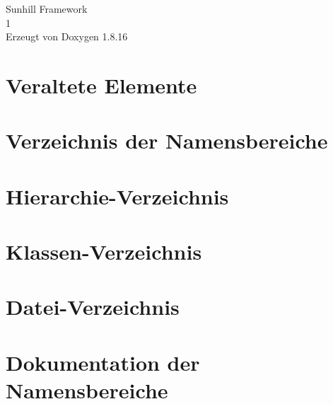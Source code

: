 \let\mypdfximage\pdfximage\def\pdfximage{\immediate\mypdfximage}\documentclass[twoside]{book}
\newcommand{\+}{\discretionary{\mbox{\scriptsize$\hookleftarrow$}}{}{}}
\newcommand{\clearemptydoublepage}{%
  \newpage{\pagestyle{empty}\cleardoublepage}%
}
\begin{document}
\hypersetup{pageanchor=false,
             bookmarksnumbered=true,
             pdfencoding=unicode
            }
\begin{titlepage}
\vspace*{7cm}
\begin{center}%
{\Large Sunhill Framework \\[1ex]\large 1 }\\
\vspace*{1cm}
{\large Erzeugt von Doxygen 1.8.16}\\
\end{center}
\end{titlepage}
\clearemptydoublepage
{}
\tableofcontents
\clearemptydoublepage
{}
\hypersetup{pageanchor=true}

\chapter{Veraltete Elemente}
\label{deprecated}

\chapter{Verzeichnis der Namensbereiche}

\chapter{Hierarchie-\/\+Verzeichnis}

\chapter{Klassen-\/\+Verzeichnis}

\chapter{Datei-\/\+Verzeichnis}

\chapter{Dokumentation der Namensbereiche}











\end{document}
